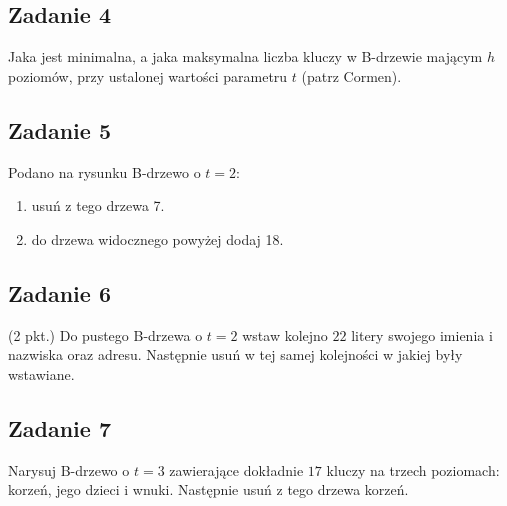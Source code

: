 \documentclass{article}
\begin{document}
\subsection*{Zadanie 4}
Jaka jest minimalna, a jaka maksymalna liczba kluczy w B-drzewie mającym $h$ poziomów, przy ustalonej wartości
parametru $t$ (patrz Cormen).

\subsection*{Zadanie 5}
Podano na rysunku B-drzewo o $t=2$:
\begin{center}
        \begin{enumerate}[label=-]
            \item usuń z tego drzewa 7.
            \item do drzewa widocznego powyżej dodaj 18.
        \end{enumerate}
\end{center}

\subsection*{Zadanie 6}
(2 pkt.) Do pustego B-drzewa o $t=2$ wstaw kolejno $22$ litery swojego imienia i nazwiska oraz adresu. Następnie usuń w
tej samej kolejności w jakiej były wstawiane.

\subsection*{Zadanie 7}
Narysuj B-drzewo o $t=3$ zawierające dokładnie $17$ kluczy na trzech poziomach: korzeń, jego dzieci i wnuki. Następnie
usuń z tego drzewa korzeń.
\end{document}
